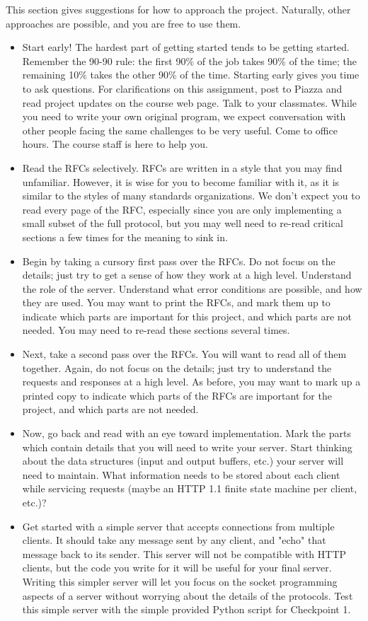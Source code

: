 \documentclass[12pt]{article}
\begin{document}
This section gives suggestions for how to approach the project. Naturally, other approaches are possible, and you are free to use them.
\begin{itemize}
\item Start early! The hardest part of getting started tends to be getting started. Remember the 90-90 rule: the first 90\% of the job takes 90\% of the time; the remaining 10\% takes the other 90\% of the time. Starting early gives you time to ask questions. For clarifications on this assignment, post to Piazza and read project updates on the course web page. Talk to your classmates. While you need to write your own original program, we expect conversation with other people facing the same challenges to be very useful. Come to office hours. The course staff is here to help you.
\item Read the RFCs selectively. RFCs are written in a style that you may find unfamiliar. However, it is wise for you to become familiar with it, as it is similar to the styles of many standards organizations. We don’t expect you to read every page of the RFC, especially since you are only implementing a small subset of the full protocol, but you may well need to re-read critical sections a few times for the meaning to sink in.
\item Begin by taking a cursory first pass over the RFCs. Do not focus on the details; just try to get a sense of how they work at a high level. Understand the role of the server. Understand what error conditions are possible, and how they are used. You may want to print the RFCs, and mark them up to indicate which parts are important for this project, and which parts are not needed. You may need to re-read these sections several times.
\item Next, take a second pass over the RFCs. You will want to read all of them together. Again, do not focus on the details; just try to understand the requests and responses at a high level. As before, you may want to mark up a printed copy to indicate which parts of the RFCs are important for the project, and which parts are not needed.
\item Now, go back and read with an eye toward implementation. Mark the parts which contain details that you will need to write your server. Start thinking about the data structures (input and output buffers, etc.) your server will need to maintain. What information needs to be stored about each client while servicing requests (maybe an HTTP 1.1 finite state machine per client, etc.)?
\item Get started with a simple server that accepts connections from multiple clients. It should take any message sent by any client, and "echo" that message back to its sender. This server will not be compatible with HTTP clients, but the code you write for it will be useful for your final server. Writing this simpler server will let you focus on the socket programming aspects of a server without worrying about the details of the protocols. Test this simple server with the simple provided Python script for Checkpoint 1.

\end{itemize}
\end{document}
